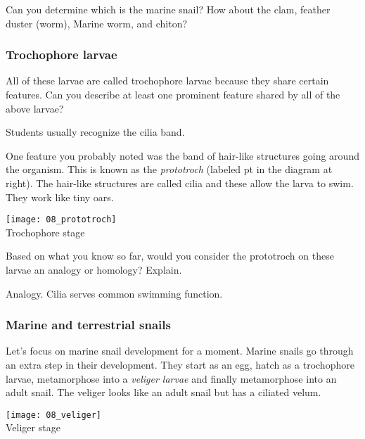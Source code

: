 \documentclass[12pt, hidelinks]{exam}
\newcommand*\AnswerBox[2]{%
    \parbox[t][#1]{0.92\textwidth}{%
    \begin{solution}#2\end{solution}}
    \vspace{\stretch{1}}
}
\begin{document}
\begin{questions}

\question
Can you determine which is the marine snail? How about the
clam, feather duster (worm), Marine worm, and chiton?

\newpage

\subsubsection*{Trochophore larvae}

\question

All of these larvae are called trochophore larvae because
they share certain features. Can you describe at least one
prominent feature shared by all of the above larvae?

\AnswerBox{3\baselineskip}{Students usually recognize the cilia band.}

\begin{minipage}{0.75\textwidth}%
One feature you probably noted was the band of hair-like structures
going around the organism. This is known as the \emph{prototroch} (labeled pt
in the diagram at right). The hair-like structures are
called cilia and these allow the larva to swim. They work like tiny
oars.
\end{minipage}\hfill
\begin{minipage}{0.25\textwidth}%
\centering\texttt{[image: 08\_prototroch]}\\%
{\footnotesize Trochophore stage\footnotemark}%
\end{minipage}

\question[2]
Based on what you know so far, would you consider the
prototroch on these larvae an analogy or homology? Explain.

\AnswerBox{3\baselineskip}{Analogy. Cilia serves common swimming function.}


\subsubsection*{Marine and terrestrial snails}

\begin{minipage}{0.75\textwidth}%
Let's focus on marine snail development for a moment. Marine snails go 
through an extra step in their development.
They start as an egg, hatch as a trochophore larvae, metamorphose into a
\emph{veliger larvae} and finally metamorphose into an adult snail.
The veliger looks like an adult snail but has a ciliated velum.
\end{minipage}\hfill
\begin{minipage}{0.25\textwidth}%
\centering\texttt{[image: 08\_veliger]}\\
{\footnotesize Veliger stage\footnotemark}
\end{minipage}


\end{questions}
\end{document}
